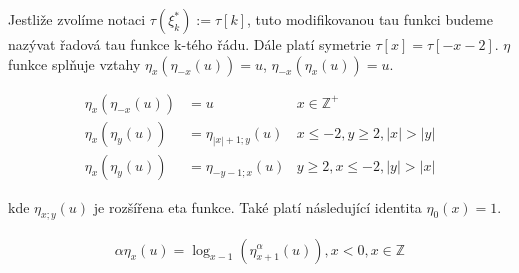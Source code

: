 Jestliže zvolíme notaci \(\tau(\xi_k^*) := \tau[k]\), tuto 
modifikovanou tau funkci budeme nazývat řadová tau funkce 
k-tého řádu. Dále platí symetrie \(\tau[x] = \tau[-x-2]\). 
\(\eta\) funkce splňuje vztahy \(\eta_x(\eta_{-x}(u)) = u\), 
\(\eta_{-x}(\eta_x(u)) = u\).

\begin{equation}
      \begin{aligned}
            \eta_x(\eta_{-x}(u))&=u & x \in \mathbb{Z}^+ \\
            \eta_x(\eta_y(u)) &= \eta_{|x|+1; y}(u) & x \leq -2, y \geq 2, |x|>|y| \\
            \eta_x(\eta_y(u)) &= \eta_{-y-1; x}(u) & y \geq 2, x \leq -2, |y|>|x| 
      \end{aligned}
\end{equation}

kde \(\eta_{x; y}(u)\) je rozšířena eta funkce.
Také platí následující identita \(\eta_0 (x) = 1\).

\begin{align}
      \alpha\eta_x(u) = \log_{x-1}(\eta_{x+1}^\alpha(u)),
      x < 0, x \in \mathbb{Z}
\end{align}


